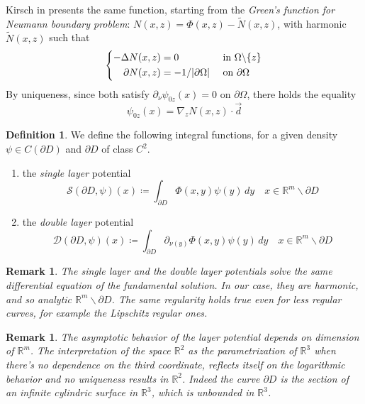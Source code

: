 \documentclass[10pt, a4paper, twoside, openright]{book}
\theoremstyle{definition}
\newtheorem{definition}[subsection]{Definition}
\theoremstyle{plain}
\theoremstyle{plain}
\theoremstyle{plain}
\theoremstyle{plain}
\newtheorem{remark}[subsection]{Remark}
\theoremstyle{plain}
\theoremstyle{plain}
\theoremstyle{plain}
\theoremstyle{plain}
\begin{document}
 Kirsch in \cite{kirsch:book} presents the same function, starting from the \emph{Green's function for Neumann boundary problem}: $N(x,z)=\Phi(x,z)-\tilde{N}(x,z)$, with harmonic $\tilde{N}(x,z)$ such that
 \begin{equation}
 \left\{
 \begin{aligned}
   -\Delta N(x,z) &= 0 &&\textup{ in }\Omega\backslash\{z\} \\
   \partial N(x,z) &= -1/|\partial \Omega|&&\textup{ on }\partial \Omega
 \end{aligned}
 \right.
 \end{equation}
 By uniqueness, since both satisfy $\partial_\nu\psi_{0z}(x)=0$ on $\partial \Omega$, there holds the equality
 \begin{equation}
  \psi_{0z}(x) = \nabla_zN(x,z) \cdot \vec{d}
 \end{equation}
 \begin{definition}
 We define the following integral functions, for a given density $\psi\in C(\partial D)$ and $\partial D$ of class $C^2$.
 \begin{enumerate}
  \item the \emph{single layer} potential
   \begin{equation}
    \mathcal{S}(\partial D,\psi)(x)\coloneqq \int_{\partial D} \Phi(x, y)\psi(y)\, dy\quad x\in\mathbb{R}^m \backslash\partial D     \label{eq:definition-single-layer}
   \end{equation}
  \item the \emph{double layer} potential
   \begin{equation}
    \mathcal{D}(\partial D,\psi)(x)\coloneqq \int_{\partial D} \partial_{\nu(y)}\Phi(x, y)\psi(y)\, dy\quad x\in\mathbb{R}^m \backslash\partial D  \label{eq:definition-double-layer}
   \end{equation}
 \end{enumerate}
\end{definition}
\begin{remark}
The single layer and the double layer potentials solve the same differential equation of the fundamental solution. In our case, they are harmonic, and so analytic $\mathbb{R}^m\backslash \partial D$. The same regularity holds true even for less regular curves, for example the Lipschitz regular ones.
\end{remark}
\begin{remark}
\label{rem:dimension}
The asymptotic behavior of the layer potential depends on dimension of $\mathbb{R}^m$.
The interpretation of the space $\mathbb{R}^2$ as the parametrization of $\mathbb{R}^3$ 
when there's no dependence on the third coordinate, reflects itself on the logarithmic 
behavior and no uniqueness results in $\mathbb{R}^2$. Indeed the curve $\partial D$ is the section of an infinite cylindric surface in $\mathbb{R}^3$, which is unbounded in $\mathbb{R}^3$.
\end{remark}
\end{document}
